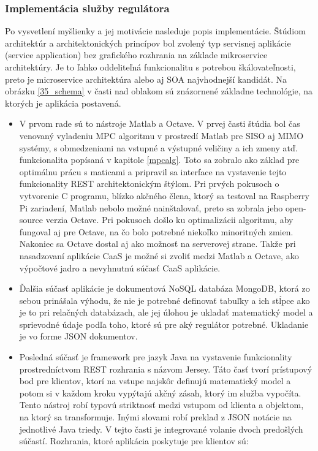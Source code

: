 \subsubsection{Implementácia služby regulátora} \label{seccaas}
Po vysvetlení myšlienky a jej motivácie nasleduje popis implementácie. Štúdiom architektúr a architektonických princípov bol zvolený typ servisnej aplikácie (service application) bez grafického rozhrania na základe mikroservice architektúry. Je to ľahko oddeliteľná funkcionalitu s potrebou škálovateľnosti, preto je microservice architektúra alebo aj SOA najvhodnejší kandidát. Na obrázku \ref{35_schema} v časti nad oblakom sú znázornené základne technológie, na ktorých je aplikácia postavená.
\begin{itemize}
  \item V prvom rade sú to nástroje Matlab a Octave. V prvej časti štúdia bol čas venovaný vyladeniu MPC algoritmu v prostredí Matlab pre SISO aj MIMO systémy, s obmedzeniami na vstupné a výstupné veličiny a ich zmeny atď. funkcionalita popísaná v  kapitole \ref{mpcalg}. Toto sa zobralo ako základ pre optimálnu prácu s maticami a pripravil sa interface na vystavenie tejto funkcionality REST architektonickým štýlom. Pri prvých pokusoch o vytvorenie C programu, blízko akčného člena, ktorý sa testoval na Raspberry Pi zariadení, Matlab nebolo možné nainštalovať, preto sa zobrala jeho open-source verzia Octave. Pri pokusoch došlo ku optimalizácii algoritmu, aby fungoval aj pre Octave, na čo bolo potrebné niekoľko minoritných zmien. Nakoniec sa Octave dostal aj ako možnosť na serverovej strane. Takže pri nasadzovaní aplikácie CaaS je možné si zvoliť medzi Matlab a Octave, ako výpočtové jadro a nevyhnutnú súčasť CaaS aplikácie.
  \item Ďalšia súčasť aplikácie je dokumentová NoSQL databáza MongoDB, ktorá zo sebou prinášala výhodu, že nie je potrebné definovať tabuľky a ich stĺpce ako je to pri relačných databázach, ale jej úlohou je ukladať matematický model a sprievodné údaje podľa toho, ktoré sú pre aký regulátor potrebné. Ukladanie je vo forme JSON dokumentov.
  \item Posledná súčasť je framework pre jazyk Java na vystavenie funkcionality prostredníctvom REST rozhrania s názvom Jersey. Táto časť tvorí prístupový bod pre klientov, ktorí na vstupe najskôr definujú matematický model a potom si v každom kroku vypýtajú akčný zásah, ktorý im služba vypočíta. Tento nástroj robí typovú striktnosť medzi vstupom od klienta a objektom, na ktorý sa transformuje. Inými slovami robí preklad z JSON notácie na jednotlivé Java triedy. V tejto časti je integrované volanie dvoch predošlých súčastí. Rozhrania, ktoré aplikácia poskytuje pre klientov sú:

\end{itemize}
